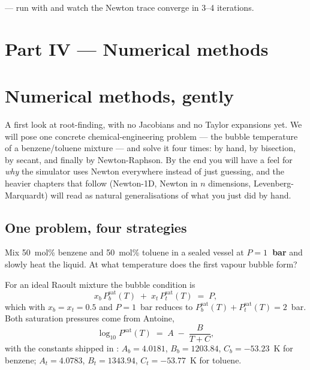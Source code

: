 \documentclass[11pt,a4paper]{article}
\begin{document}
\begin{tutoriallink}
 --- run with
 and watch the Newton trace converge in 3--4
iterations.
\end{tutoriallink}

\section*{Part IV --- Numerical methods}
{}

\setcounter{section}{0}

\section{Numerical methods, gently}\label{ch:gentle}

\begin{whatyoulllearn}
A first look at root-finding, with no Jacobians and no Taylor
expansions yet.  We will pose one concrete chemical-engineering
problem --- the bubble temperature of a benzene/toluene mixture ---
and solve it four times: by hand, by bisection, by secant, and
finally by Newton-Raphson.  By the end you will have a feel for
\emph{why} the simulator uses Newton everywhere instead of just
guessing, and the heavier chapters that follow (Newton-1D, Newton in
$n$ dimensions, Levenberg-Marquardt) will read as natural
generalisations of what you just did by hand.
\end{whatyoulllearn}

\subsection{One problem, four strategies}

Mix 50~mol\% benzene and 50~mol\% toluene in a sealed vessel at
\textbf{$P = 1$~bar} and slowly heat the liquid.  At what temperature
does the first vapour bubble form?

For an ideal Raoult mixture the bubble condition is
\begin{equation}
   x_b\, P^{\mathrm{sat}}_b(T) \;+\; x_t\, P^{\mathrm{sat}}_t(T) \;=\; P,
   \label{eq:gentle-bubble}
\end{equation}
which with $x_b = x_t = 0.5$ and $P = 1$~bar reduces to
$P^{\mathrm{sat}}_b(T) + P^{\mathrm{sat}}_t(T) = 2$~bar.  Both saturation
pressures come from Antoine,
\[
   \log_{10} P^{\mathrm{sat}}(T) \;=\; A \;-\; \frac{B}{T+C},
\]
with the constants shipped in
: $A_b = 4.0181$, $B_b = 1203.84$,
$C_b = -53.23$~K for benzene; $A_t = 4.0783$, $B_t = 1343.94$,
$C_t = -53.77$~K for toluene.
\end{document}
